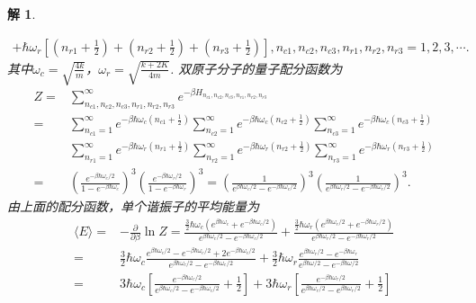 \documentclass[UTF8,10pt,a4paper]{article}
\theoremstyle{Problem}
\theoremstyle{Solution}
\newtheorem*{sol}{解}
\begin{document}
\begin{sol}
\begin{itemize}
\begin{multline}
                  +\hbar\omega_r\left[\left(n_{r1}+\frac{1}{2}\right)+\left(n_{r2}+\frac{1}{2}\right)+\left(n_{r3}+\frac{1}{2}\right)\right],n_{c1},n_{c2},n_{c3},n_{r1},n_{r2},n_{r3}=1,2,3,\cdots.
              \end{multline}
              其中$\omega_c=\sqrt{\frac{4k}{m}}$，$\omega_r=\sqrt{\frac{k+2K}{4m}}$. 双原子分子的量子配分函数为
              \begin{align}
                  \nonumber Z=&\sum_{n_{c1},n_{c2},n_{c3},n_{r1},n_{r2},n_{r3}}^{\infty}e^{-\beta H_{n_{c1},n_{c2},n_{c3},n_{r1},n_{r2},n_{r3}}}\\
                  \nonumber=&\sum_{n_{c1}=1}^{\infty}e^{-\beta\hbar\omega_c\left(n_{c1}+\frac{1}{2}\right)}\sum_{n_{c2}=1}^{\infty}e^{-\beta\hbar\omega_c\left(n_{c2}+\frac{1}{2}\right)}\sum_{n_{c3}=1}^{\infty}e^{-\beta\hbar\omega_c\left(n_{c3}+\frac{1}{2}\right)}\\
                  \nonumber&\sum_{n_{r1}=1}^{\infty}e^{-\beta\hbar\omega_r\left(n_{r1}+\frac{1}{2}\right)}\sum_{n_{r2}=1}^{\infty}e^{-\beta\hbar\omega_r\left(n_{r2}+\frac{1}{2}\right)}\sum_{n_{r3}=1}^{\infty}e^{-\beta\hbar\omega_r\left(n_{r3}+\frac{1}{2}\right)}\\
                  =&\left(\frac{e^{-\beta\hbar\omega_c/2}}{1-e^{-\beta\hbar\omega_c}}\right)^3\left(\frac{e^{-\beta\hbar\omega_r/2}}{1-e^{-\beta\hbar\omega_r}}\right)^3=\left(\frac{1}{e^{\beta\hbar\omega_c/2}-e^{-\beta\hbar\omega_c/2}}\right)^3\left(\frac{1}{e^{\beta\hbar\omega_r/2}-e^{-\beta\hbar\omega_r/2}}\right)^3.
              \end{align}
              由上面的配分函数，单个谐振子的平均能量为
              \begin{align}
                \nonumber\langle E\rangle=&-\frac{\partial}{\partial\beta}\ln Z=\frac{\frac{3}{2}\hbar\omega_c\left(e^{\beta\hbar\omega_c}+e^{-\beta\hbar\omega_c/2}\right)}{e^{\beta\hbar\omega_c/2}-e^{-\beta\hbar\omega_c/2}}+\frac{\frac{3}{2}\hbar\omega_r\left(e^{\beta\hbar\omega_r/2}+e^{-\beta\hbar\omega_r/2}\right)}{e^{\beta\hbar\omega_r/2}-e^{-\beta\hbar\omega_r/2}}\\
                \nonumber=&\frac{3}{2}\hbar\omega_c\frac{e^{\beta\hbar\omega_c/2}-e^{-\beta\hbar\omega_c/2}+2e^{-\beta\hbar\omega_c/2}}{e^{\beta\hbar\omega_c/2}-e^{-\beta\hbar\omega_c/2}}+\frac{3}{2}\hbar\omega_r\frac{e^{\beta\hbar\omega_r/2}-e^{-\beta\hbar\omega_r}}{e^{\beta\hbar\omega/2}-e^{-\beta\hbar\omega/2}}\\
                \nonumber=&3\hbar\omega_c\left[\frac{e^{-\beta\hbar\omega_c/2}}{e^{\beta\hbar\omega_c/2}-e^{-\beta\hbar\omega_c/2}}+\frac{1}{2}\right]+3\hbar\omega_r\left[\frac{e^{-\beta\hbar\omega_r/2}}{e^{\beta\hbar\omega_r/2}-e^{\beta\hbar\omega_r/2}}+\frac{1}{2}\right]\\

\end{align}
\end{itemize}
\end{sol}
\end{document}
